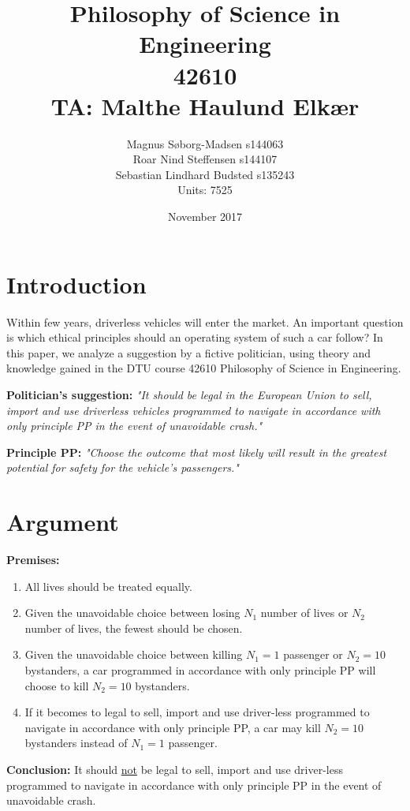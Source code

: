 \documentclass{article}
\title{Philosophy of Science in Engineering\\
42610\\
TA: Malthe Haulund Elkær}
\author{Magnus Søborg-Madsen s144063\\Roar Nind Steffensen s144107\\Sebastian Lindhard Budsted s135243\\
Units: 7525}
\date{November 2017}
\begin{document}
\maketitle


\section{Introduction}

Within few years, driverless vehicles will enter the market. An important question is which ethical principles should an operating system of such a car follow? In this paper, we analyze a suggestion by a fictive politician, using theory and knowledge gained in the DTU course 42610 Philosophy of Science in Engineering.


\textbf{Politician's suggestion:}
\textit{"It should be legal in the European Union to sell, import and use driverless vehicles programmed to navigate in accordance with only principle PP in the event of unavoidable crash."}

\textbf{Principle PP:} 
\textit{"Choose the outcome that most likely will result in the greatest potential for safety for the vehicle’s passengers." }


\section{Argument}

\textbf{Premises:}
\begin{enumerate}
\item All lives should be treated  equally.

\item Given the unavoidable choice between losing $N_1$ number of lives or $N_2$ number of lives, the fewest should be chosen.

\item Given the unavoidable choice between killing $N_1 = 1$ passenger or $N_2 = 10$ bystanders, a car programmed in accordance with only principle PP will choose to kill $N_2 = 10$ bystanders.

\item If it becomes to legal to sell, import and use driver-less programmed to navigate in accordance with only principle PP, a car may kill $N_2 = 10$ bystanders instead of $N_1 = 1$ passenger.

\end{enumerate}

\textbf{Conclusion:} It should \underline{not} be legal to sell, import and use driver-less programmed to navigate in accordance with only principle PP in the event of unavoidable crash.


%
%
%
%



\end{document}
